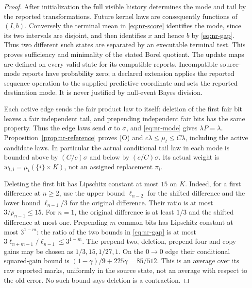 \begin{proof}
After initialization the full visible history determines the mode and tail by the reported transformations. Future kernel laws are consequently functions of $(I,b)$. Conversely the terminal mean in \eqref{eq:nr-score} identifies the mode, since its two intervals are disjoint, and then identifies $x$ and hence $b$ by \eqref{eq:nr-gap}. Thus two different such states are separated by an executable terminal test. This proves sufficiency and minimality of the stated Borel quotient. The update maps are defined on every valid state for its compatible reports. Incompatible source-mode reports have probability zero; a declared extension applies the reported sequence operation to the supplied predictive coordinate and sets the reported destination mode. It is never justified by null-event Bayes division.

Each active edge sends the fair product law to itself: deletion of the first fair bit leaves a fair independent tail, and prepending independent fair bits has the same property. Thus the edge laws send $\sigma$ to $\sigma$, and \eqref{eq:nr-mode} gives $\lambda P=\lambda$. Proposition~\ref{prop:nr-reference} proves \textup{(O)} and $c\lambda\le\mu_t\le C\lambda$, including the active candidate laws. In particular the actual conditional tail law in each mode is bounded above by $(C/c)\sigma$ and below by $(c/C)\sigma$. Its actual weight is $w_{t,i}=\mu_t(\{i\}\times K)$, not an assigned replacement $\pi_i$.

Deleting the first bit has Lipschitz constant at most $15$ on $K$. Indeed, for a first difference at $n\ge2$, use the upper bound $\ell_{n-2}$ for the shifted difference and the lower bound $\ell_{n-1}/3$ for the original difference. Their ratio is at most $3/\rho_{n-1}\le15$. For $n=1$, the original difference is at least $1/3$ and the shifted difference at most one. Prepending $m$ common bits has Lipschitz constant at most $3^{1-m}$: the ratio of the two bounds in \eqref{eq:nr-gap} is at most $3\ell_{n+m-1}/\ell_{n-1}\le3^{1-m}$. The prepend-two, deletion, prepend-four and copy gains may be chosen as $1/3,15,1/27,1$. On the $0\to0$ edge their conditional squared-gain bound is $(1-\gamma)/9+225\gamma=85/512$. This is an average over its raw reported marks, uniformly in the source state, not an average with respect to the old error. No such bound says deletion is a contraction.


\end{proof}
